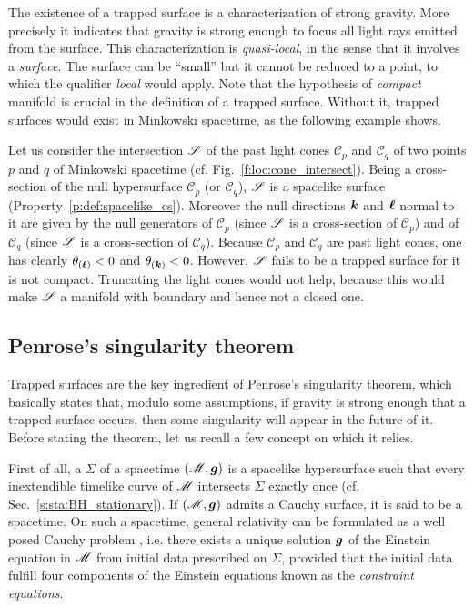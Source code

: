 The existence of a trapped surface is a characterization of
strong gravity. More precisely it indicates that gravity is strong enough
to focus all light rays emitted from the surface.
This characterization is \emph{quasi-local}, in the sense that it involves a \emph{surface}. The
surface can be ``small'' but it cannot be reduced to a point, to which the qualifier \emph{local}
would apply. Note that the hypothesis of \emph{compact} manifold is crucial in the definition of a
trapped surface. Without it, trapped surfaces would exist in Minkowski
spacetime, as the following example shows.

\begin{example}
Let us consider the intersection $\mathscr{S}$ of the past light cones $\mathscr{C}_p$ and $\mathscr{C}_q$
of two points $p$ and $q$ of Minkowski spacetime (cf. Fig.~\ref{f:loc:cone_intersect}).
Being a cross-section of the null hypersurface $\mathscr{C}_p$ (or $\mathscr{C}_q$),
$\mathscr{S}$ is a spacelike surface (Property~\ref{p:def:spacelike_cs}).
Moreover the null directions $\bm{k}$ and $\bm{\ell}$ normal to it are given by the null generators of
$\mathscr{C}_p$ (since $\mathscr{S}$ is a cross-section of $\mathscr{C}_p$)
and of $\mathscr{C}_q$ (since $\mathscr{S}$ is a cross-section of $\mathscr{C}_q$).
Because $\mathscr{C}_p$ and $\mathscr{C}_q$ are past light cones, one has clearly
$\theta_{(\bm{\ell})} < 0$ and $\theta_{(\bm{k})} < 0$.
However, $\mathscr{S}$ fails to be a trapped surface for it is not compact. Truncating the light cones
would not help, because this would make $\mathscr{S}$ a manifold with boundary and hence not a closed one.
\end{example}


\subsection{Penrose's singularity theorem}

Trapped surfaces are the key ingredient of Penrose's singularity theorem,
which basically states that, modulo some assumptions, if gravity is
strong enough that a trapped surface occurs, then some singularity will
appear in the future of it.
Before stating the theorem, let us recall a few concept on which it relies.

First of all, a 
$\Sigma$ of a spacetime $(\mathscr{M},\bm{g})$ is a spacelike
hypersurface such that every inextendible timelike curve of $\mathscr{M}$
intersects $\Sigma$ exactly once (cf. Sec.~\ref{s:sta:BH_stationary}). If $(\mathscr{M},\bm{g})$
admits a Cauchy surface, it is said to be a
 spacetime.
On such a spacetime, general relativity can be formulated as a well posed
Cauchy problem \cite{ChoquG69},
i.e. there exists a unique solution $\bm{g}$ of the Einstein equation
in $\mathscr{M}$ from initial data prescribed on $\Sigma$, provided that the initial data
fulfill four components of the Einstein equations known as the
\emph{constraint equations}.


